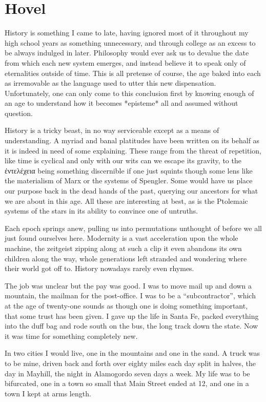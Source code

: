 \documentclass[ebook, 10pt, openright, onecolumn]{memoir}
\newcommand{\textgreek}[1]{\begingroup\fontencoding{LGR}\selectfont#1\endgroup}
\newcommand*\td[1]{
  \todo[inline]{
     #1 
  }
}
\newcommand*\finish{\td{ ----- Finish this section -----}}
\begin{document}
\chapter{Hovel}
\label{cha:hovel}

History is something I came to late, having ignored most of it throughout my
high school years as something unnecessary, and through college as an excess to
be always indulged in later.  Philosophy would ever ask us to devalue the date
from which each new system emerges, and instead believe it to speak only of
eternalities outside of time.  This is all pretense of course, the age baked
into each as irremovable as the language used to utter this new dispensation.
Unfortunately, one can only come to this conclusion first by knowing enough of
an age to understand how it becomes *episteme* all and assumed without
question.

History is a tricky beast, in no way serviceable except as a means of
understanding.  A myriad and banal platitudes have been written on its behalf as
it is indeed in need of some explaining.  These range from the threat of
repetition, like time is cyclical and only with our wits can we escape its
gravity, to the \textgreek{ἐντελέχεια} being something discernible if one just squints
though some lens like the materialism of Marx or the systems of Spengler. Some
would have us place our purpose back in the dead hands of the past, querying our
ancestors for what we are about in this age.  All these are interesting at best,
as is the Ptolemaic systems of the stars in its ability to convince one of
untruths.

Each epoch springs anew, pulling us into permutations unthought of before we all
just found ourselves here.  Modernity is a vast acceleration upon the whole
machine, the zeitgeist zipping along at such a clip it even abandons its own
children along the way, whole generations left stranded and wondering where
their world got off to.  History nowadays rarely even rhymes.
\finish{}

The job was unclear but the pay was good.  I was to move mail up and down a
mountain, the mailman for the post-office.  I was to be a ``subcontractor'', which
at the age of twenty-one sounds as though one is doing something important, that
some trust has been given.  I gave up the life in Santa Fe,  packed everything
into the duff bag and rode south on the bus, the long track down the state.  Now
it was time for something completely new.

In two cities I would live, one in the mountains and one in the sand.  A truck
was to be mine, driven back and forth over eighty miles each day split in
halves, the day in Mayhill, the night in Alamogordo seven days a week.  My life
was to be bifurcated, one in a town so small that Main Street ended at 12, and
one in a town I kept at arms length.
\end{document}
